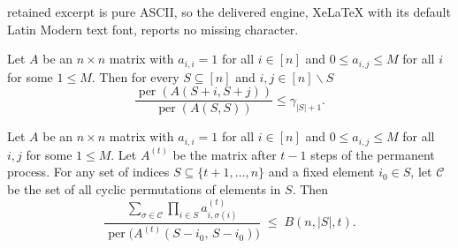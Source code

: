 \documentclass[10pt,a4paper]{amsart}
\DeclareMathOperator{\per}{per}
\newcommand{\del}{\backslash}
\begin{document}
retained excerpt is pure ASCII, so the delivered engine, XeLaTeX with its default Latin Modern text font, reports no missing character.
\begin{observation} 
\label{obs:perm_ratio_bound}
Let $A$ be an $n \times n$ matrix with $a_{i,i} = 1$ for all $i \in [n]$ and $0\leq a_{i,j} \le M$ for all $i$ for some $1\leq M$. Then for every $ S\subseteq [n]$ and $i,j \in [n]\del S$
\begin{equation*}
    \frac{\per(A(S+i, S+j))}{\per(A(S,S))} \le \gamma_{|S|+1}.
\end{equation*}
\end{observation} 

\begin{lemma}\label{lem:cycles_bound}
Let $A$ be an $n \times n$ matrix with $a_{i,i} = 1$ for all $i \in [n]$ and $0\leq a_{i,j} \le M$ for all $i,j$ for some $1\leq M$. Let $A^{(t)}$ be the matrix after $t-1$ steps of the permanent process. For any set of indices $S \subseteq \{t+1, \dots, n\}$ and a fixed element $i_0 \in S$, let $\mathcal{C}$ be the set of all cyclic permutations of elements in $S$. Then
\begin{equation*}
     \frac{\displaystyle \sum_{\sigma \in \mathcal{C}} \prod_{i \in S} a^{(t)}_{i,\sigma(i)}}
       {\per\!\big(A^{(t)}(S - i_0 ,\,S - i_0)\big)}
  \;\leq\; B(n,|S|,t).
\end{equation*}
\end{lemma}
\end{document}
